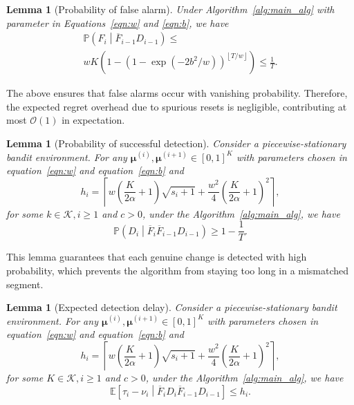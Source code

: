 \documentclass[twoside]{article}
\def\eqref#1{equation~\ref{#1}}
\def\Algref#1{Algorithm~\ref{#1}}
\def\gK{{\mathcal{K}}}
\newcommand{\E}{\mathbb{E}}
\theoremstyle{plain}
\newtheorem{lemma}[theorem]{Lemma}
\theoremstyle{definition}
\theoremstyle{remark}
\begin{document}
\begin{lemma}[Probability of false alarm]\label{lemma:prob_fa} 
Under Algorithm~\ref{alg:main_alg} with parameter in Equations~\ref{eqn:w} and \ref{eqn:b}, we have
\vspace{-5pt}
\begin{multline}
    \mathbb{P}\left(F_{i}\middle|\overline{F}_{i-1}D_{i-1}\right)\leq \\ 
    wK\left(1-\left(1-\exp\left(-2b^{2}/w\right)\right)^{\left\lfloor T/w \right\rfloor }\right)\leq \frac{1}{T}.    
\end{multline}
\end{lemma}
\vspace{-10pt}
The above ensures that false alarms occur with vanishing probability. Therefore, the expected regret overhead due to spurious resets is negligible, contributing at most $\mathcal{O}(1)$ in expectation.

\begin{lemma}[Probability of successful detection]\label{lemma:prob_delay} 
Consider a piecewise-stationary bandit environment. For any $\boldsymbol{\mu}^{(i)},\boldsymbol{\mu}^{(i+1)}\in\left[0,1\right]^{K}$ with parameters chosen in \eqref{eqn:w} and \eqref{eqn:b} 
and
\begin{equation}
h_{i} = \left\lceil w\left(\frac{K}{2\alpha}+1\right)\sqrt{s_{i}+1}+\frac{w^{2}}{4}\left(\frac{K}{2\alpha}+1\right)^{2} \right\rceil,
\end{equation}
for some $k\in\gK, i\geq 1$ and $c>0$, under the \Algref{alg:main_alg}, we have 
\begin{equation}
    \mathbb{P}\left(D_{i}\middle|\overline{F}_{i}\overline{F}_{i-1}D_{i-1}\right)\geq 1-\frac{1}{T}.
\end{equation}
\end{lemma}
\vspace{-10pt}
This lemma guarantees that each genuine change is detected with high probability, which prevents the algorithm from staying too long in a mismatched segment.

\begin{lemma}[Expected detection delay]\label{lemma:exp_delay} 
Consider a piecewise-stationary bandit environment. For any $\boldsymbol{\mu}^{(i)},\boldsymbol{\mu}^{(i+1)}\in\left[0,1\right]^{K}$ with parameters chosen in \eqref{eqn:w} and \eqref{eqn:b} 
and
\begin{equation}
h_{i} = \left\lceil w\left(\frac{K}{2\alpha}+1\right)\sqrt{s_{i}+1}+\frac{w^{2}}{4}\left(\frac{K}{2\alpha}+1\right)^{2} \right\rceil,
\end{equation}
for some $K\in\gK, i\geq 1$ and $c>0$, under the \Algref{alg:main_alg}, we have
\begin{equation}
    \E\left[\tau_{i}-\nu_{i}\middle| \overline{F}_{i}D_{i}\overline{F}_{i-1}D_{i-1}\right]\leq h_{i}.
\end{equation}
\end{lemma}
\end{document}
